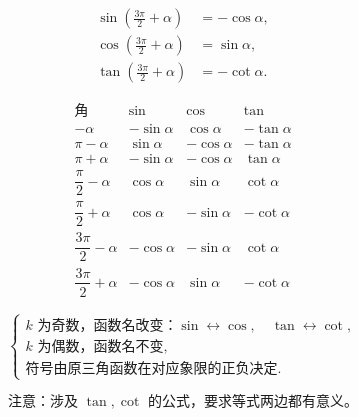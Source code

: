 \[
	\begin{aligned}
		\sin\left(\frac{3\pi}{2}+\alpha\right) & =-\cos\alpha, \\
		\cos\left(\frac{3\pi}{2}+\alpha\right) & =\sin\alpha,  \\
		\tan\left(\frac{3\pi}{2}+\alpha\right) & =-\cot\alpha.
	\end{aligned}
\]

\[
	\begin{array}{c|ccc}
		\text{角} & \sin        & \cos & \tan \\ \hline
		-\alpha
		         & -\sin\alpha
		         & \cos\alpha
		         & -\tan\alpha               \\[4pt]

		\pi-\alpha
		         & \sin\alpha
		         & -\cos\alpha
		         & -\tan\alpha               \\[4pt]

		\pi+\alpha
		         & -\sin\alpha
		         & -\cos\alpha
		         & \tan\alpha                \\[4pt]

		\dfrac{\pi}{2}-\alpha
		         & \cos\alpha
		         & \sin\alpha
		         & \cot\alpha                \\[6pt]

		\dfrac{\pi}{2}+\alpha
		         & \cos\alpha
		         & -\sin\alpha
		         & -\cot\alpha               \\[6pt]

		\dfrac{3\pi}{2}-\alpha
		         & -\cos\alpha
		         & -\sin\alpha
		         & \cot\alpha                \\[6pt]

		\dfrac{3\pi}{2}+\alpha
		         & -\cos\alpha
		         & \sin\alpha
		         & -\cot\alpha
	\end{array}
\]

\[
	\begin{cases}
		k\text{ 为奇数，函数名改变：}\sin\leftrightarrow\cos,\quad \tan\leftrightarrow\cot, \\
		k\text{ 为偶数，函数名不变},                                                       \\
		\text{符号由原三角函数在对应象限的正负决定}.
	\end{cases}
\]

\[
	\text{注意：涉及 }\tan,\cot\text{ 的公式，要求等式两边都有意义。}
\]